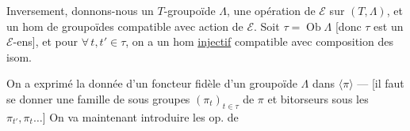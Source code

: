 Inversement, donnons-nous   un $T$-groupoïde  $\Lambda$, une opération de $\mathcal E$ sur $(T,\Lambda)$, et un hom de groupoïdes
compatible avec action de $\mathcal E$.
Soit $\tau=\operatorname{Ob}\Lambda$ [donc $\tau$ est un $\mathcal E$-ens], et pour $\forall\,t,t'\in\tau$, on a un hom \uline{injectif}
compatible avec composition des isom.

On a exprimé la donnée d'un foncteur fidèle d'un groupoïde $\Lambda$ dans $\langle\pi\rangle$ ---  [il faut se donner une famille de sous groupes $(\pi_t)_{t\in\tau}$ de $\pi$ et  bitorseurs sous les $\pi_{t'},\pi_t\ldots$] On va maintenant introduire les op. de
